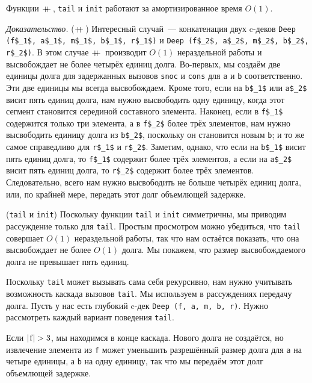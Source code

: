 \begin{theorem}\label{th:11.2}
  Функции $+\!\!\!+\,$, \lstinline!tail! и \lstinline!init! работают за
  амортизированное время $O(1)$.

  \noindent
  \emph{Доказательство.} ($+\!\!\!+\,$) Интересный случай~---
  конкатенация двух c-деков
  \lstinline!Deep (f$_1$, a$_1$, m$_1$, b$_1$, r$_1$)! и
  \lstinline!Deep (f$_2$, a$_2$, m$_2$, b$_2$, r$_2$)!.
  В этом случае $+\!\!\!+\,$ производит $O(1)$ нераздельной работы и
  высвобождает не более четырёх единиц долга. Во-первых, мы создаём
  две единицы долга для задержанных вызовов \lstinline!snoc! и
  \lstinline!cons! для \lstinline!a! и \lstinline!b!
  соответственно. Эти две единицы мы всегда высвобождаем. Кроме того,
  если на \lstinline!b$_1$! или \lstinline!a$_2$! висит пять единиц
  долга, нам нужно высвободить одну единицу, когда этот сегмент
  становится серединой составного элемента.  Наконец, если в
  \lstinline!f$_1$! содержится только три элемента, а в
  \lstinline!f$_2$! более трёх элементов, нам нужно высвободить
  единицу долга из \lstinline!b$_2$!, поскольку он становится новым
  \lstinline!b!; и то же самое справедливо для \lstinline!r$_1$! и
  \lstinline!r$_2$!. Заметим, однако, что если на \lstinline!b$_1$!
  висит пять единиц долга, то \lstinline!f$_1$! содержит более трёх
  элементов, а если на \lstinline!a$_2$! висит пять единиц долга, то
  \lstinline!r$_2$! содержит более трёх элементов. Следовательно,
  всего нам нужно высвободить не больше четырёх единиц
  долга, или, по крайней мере, передать этот долг объемлющей задержке.

  (\lstinline!tail! и \lstinline!init!) Поскольку функции
  \lstinline!tail! и \lstinline!init! симметричны, мы приводим
  рассуждение только для \lstinline!tail!. Простым просмотром можно
  убедиться, что \lstinline!tail! совершает $O(1)$ нераздельной
  работы, так что нам остаётся показать, что она высвобождает не более
  $O(1)$ долга. Мы покажем, что размер высвобождаемого долга не
  превышает пять единиц.

  Поскольку \lstinline!tail! может вызывать сама себя рекурсивно, нам
  нужно учитывать возможность каскада вызовов \lstinline!tail!. Мы
  используем в рассуждениях передачу долга. Пусть у нас есть глубокий
  c-дек \lstinline!Deep (f, a, m, b, r)!. Нужно рассмотреть каждый
  вариант поведения \lstinline!tail!.

  Если $|\lstinline!f!| > 3$, мы находимся в конце каскада. Нового
  долга не создаётся, но извлечение элемента из \lstinline!f! может
  уменьшить разрешённый размер долга для \lstinline!a! на четыре
  единицы, а \lstinline!b! на одну единицу, так что мы передаём этот
  долг объемлющей задержке.


\end{theorem}
